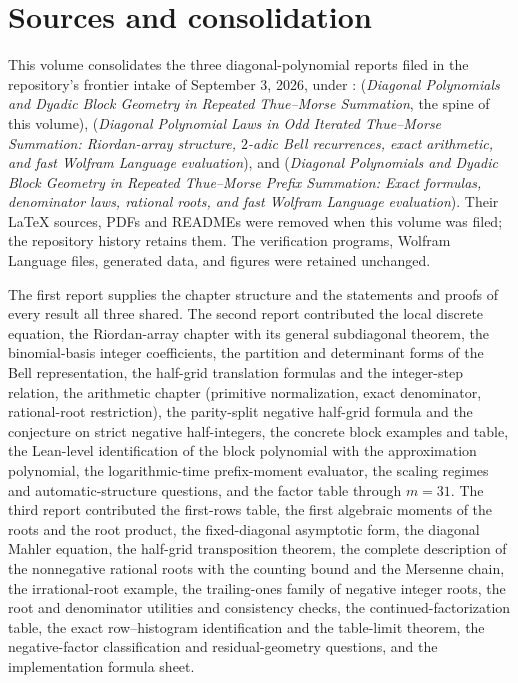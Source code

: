 \documentclass[11pt,a4paper,oneside,openany]{book}
\numberwithin{equation}{chapter}
\theoremstyle{definition}
\theoremstyle{remark}
\begin{document}
\section{Sources and consolidation}
This volume consolidates the three diagonal-polynomial reports filed in
the repository's frontier intake of September 3, 2026, under
: 
(\emph{Diagonal Polynomials and Dyadic Block Geometry in Repeated
Thue--Morse Summation}, the spine of this volume),
 (\emph{Diagonal Polynomial Laws in
Odd Iterated Thue--Morse Summation: Riordan-array structure, $2$-adic Bell
recurrences, exact arithmetic, and fast Wolfram Language evaluation}), and
 (\emph{Diagonal
Polynomials and Dyadic Block Geometry in Repeated Thue--Morse Prefix
Summation: Exact formulas, denominator laws, rational roots, and fast
Wolfram Language evaluation}). Their \LaTeX{} sources, PDFs and READMEs were
removed when this volume was filed; the repository history retains them.
The verification programs, Wolfram Language files, generated data, and
figures were retained unchanged.

The first report supplies the chapter structure and the statements and
proofs of every result all three shared. The second report contributed the
local discrete equation, the Riordan-array chapter with its general
subdiagonal theorem, the binomial-basis integer coefficients, the partition
and determinant forms of the Bell representation, the half-grid
translation formulas and the integer-step relation, the arithmetic chapter
(primitive normalization, exact denominator, rational-root restriction),
the parity-split negative half-grid formula and the conjecture on strict
negative half-integers, the concrete block examples and table, the
Lean-level identification of the block polynomial with the approximation
polynomial, the logarithmic-time prefix-moment evaluator, the scaling
regimes and automatic-structure questions, and the factor table through
$m=31$. The third report contributed the first-rows table, the first
algebraic moments of the roots and the root product, the fixed-diagonal
asymptotic form, the diagonal Mahler equation, the half-grid transposition
theorem, the complete description of the nonnegative rational roots with
the counting bound and the Mersenne chain, the irrational-root example, the
trailing-ones family of negative integer roots, the root and denominator
utilities and consistency checks, the continued-factorization table, the
exact row--histogram identification and the table-limit theorem, the
negative-factor classification and residual-geometry questions, and the
implementation formula sheet.
\end{document}

